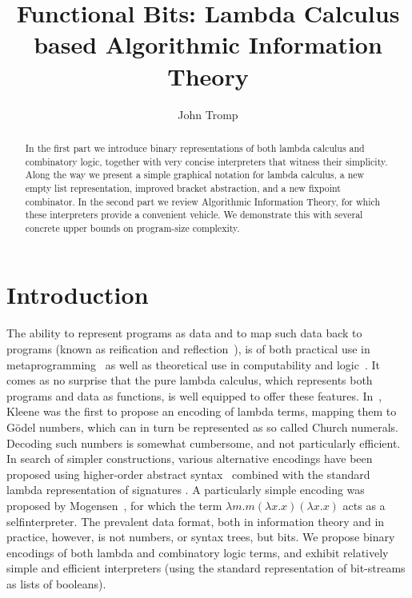 \documentclass{article}
\title{Functional Bits: Lambda Calculus based Algorithmic Information Theory }
\author{John Tromp}
\begin{document}
\maketitle

\begin{abstract}
In the first part we introduce binary representations of both lambda calculus
and combinatory logic, together with very concise interpreters that witness
their simplicity. Along the way we present a simple graphical notation for lambda calculus,
a new empty list representation, improved bracket abstraction, and a new fixpoint combinator.
In the second part
we review Algorithmic Information Theory, for which
these interpreters provide a convenient vehicle.
We demonstrate this with several concrete upper bounds
on program-size complexity.
\end{abstract}

\section{Introduction}

The ability to represent programs as data and to map such data back
to programs (known as reification and reflection~\cite{fw}),
is of both practical use in
metaprogramming~\cite{dm} as well as theoretical use in computability and
logic~\cite{geb}.
It comes as no surprise that the pure lambda calculus,
which represents both programs and data as functions,
is well equipped to offer these features.
In~\cite{kl}, Kleene was the first to propose an encoding of lambda terms,
mapping them to G\"{o}del numbers, which can in turn be represented as
so called Church numerals.
Decoding such numbers is somewhat cumbersome, and not particularly efficient.
In search of simpler constructions, various alternative encodings have been proposed using
higher-order abstract syntax~\cite{PE88}
combined with the standard lambda representation of signatures \cite{SM89}.
A particularly simple encoding was proposed by Mogensen~\cite{m00},
for which the term $\lambda m.m(\lambda x.x)(\lambda x.x)$ acts as a
selfinterpreter.
The prevalent data format, both in information theory and in practice,
however, is not numbers, or syntax trees, but bits.
We propose binary encodings of both lambda and combinatory
logic terms, and exhibit relatively simple
and efficient interpreters (using the standard representation of
bit-streams as lists of booleans).
\end{document}
